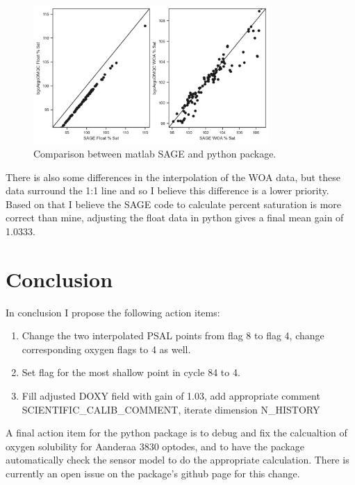 \documentclass[11pt,english]{article} %
\begin{document}
\begin{figure}[H]
    \centering
    \includegraphics[width=0.8\textwidth]{../figures/4900497/sage_comparison.png}
    \caption{Comparison between matlab SAGE and python package.}
\end{figure}

There is also some differences in the interpolation of the WOA data, but these
data surround the 1:1 line and so I believe this difference is a lower
priority. Based on that I believe the SAGE code to calculate percent saturation
is more correct than mine, adjusting the float data in python gives a final mean
gain of 1.0333. 

\section{Conclusion}

In conclusion I propose the following action items:

\begin{enumerate}
    \item Change the two interpolated PSAL points from flag 8 to flag 4,
    change corresponding oxygen flags to 4 as well.
    \item Set flag for the most shallow point in cycle 84 to 4.
    \item Fill adjusted DOXY field with gain of 1.03, add appropriate comment
    SCIENTIFIC\_CALIB\_COMMENT, iterate dimension N\_HISTORY
\end{enumerate}

A final action item for the python package is to debug and fix the calcualtion
of oxygen solubility for Aanderaa 3830 optodes, and to have the package
automatically check the sensor model to do the appropriate calculation. There
is currently an open issue on the package's github page for this change.
\end{document}
